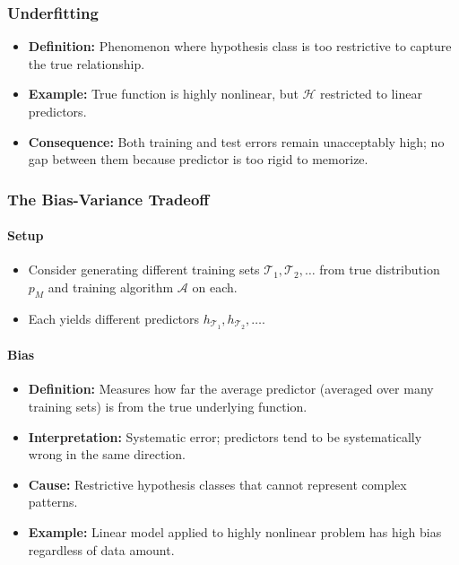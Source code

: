 \subsubsection*{Underfitting}
\begin{itemize}
    \item \textbf{Definition:} Phenomenon where hypothesis class is too restrictive to capture the true relationship.
    \item \textbf{Example:} True function is highly nonlinear, but $\mathcal{H}$ restricted to linear predictors.
    \item \textbf{Consequence:} Both training and test errors remain unacceptably high; no gap between them because predictor is too rigid to memorize.
\end{itemize}

\subsubsection*{The Bias-Variance Tradeoff}

\paragraph{Setup}
\begin{itemize}
    \item Consider generating different training sets $\mathcal{T}_1, \mathcal{T}_2, \ldots$ from true distribution $p_M$ and training algorithm $\mathcal{A}$ on each.
    \item Each yields different predictors $h_{\mathcal{T}_1}, h_{\mathcal{T}_2}, \ldots$.
\end{itemize}

\paragraph{Bias}
\begin{itemize}
    \item \textbf{Definition:} Measures how far the average predictor (averaged over many training sets) is from the true underlying function.
    \item \textbf{Interpretation:} Systematic error; predictors tend to be systematically wrong in the same direction.
    \item \textbf{Cause:} Restrictive hypothesis classes that cannot represent complex patterns.
    \item \textbf{Example:} Linear model applied to highly nonlinear problem has high bias regardless of data amount.
\end{itemize}

